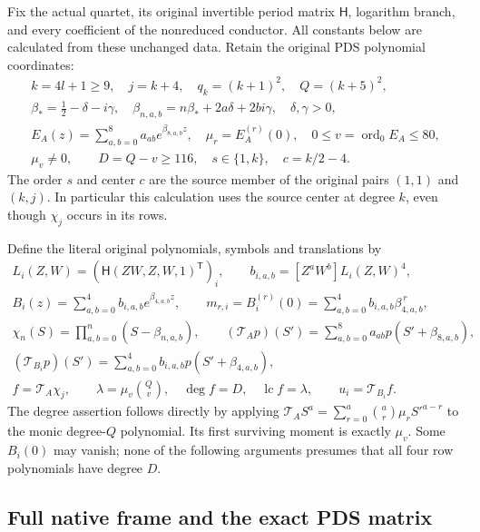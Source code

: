 \documentclass[10pt]{article}
\begin{document}
Fix the actual quartet, its original invertible period matrix
$\mathsf H$, logarithm branch, and every coefficient of the nonreduced
conductor. All constants below are calculated from these unchanged data.
Retain the original PDS polynomial coordinates:
\[
\begin{gathered}
 k=4l+1\ge9,\quad j=k+4,\quad q_k=(k+1)^2,\quad Q=(k+5)^2,\\
 \beta_*=\tfrac12-\delta-i\gamma,\quad
 \beta_{n,a,b}=n\beta_*+2a\delta+2bi\gamma,\quad\delta,\gamma>0,\\
 E_A(z)=\sum_{a,b=0}^8a_{ab}e^{\beta_{8,a,b}z},\quad
 \mu_r=E_A^{(r)}(0),\quad0\le v=\operatorname{ord}_0 E_A\le80,\\
 \mu_v\ne0,\qquad D=Q-v\ge116,\quad s\in\{1,k\},\quad c=k/2-4 .
\end{gathered}\tag{PFG1}
\]
The order $s$ and center $c$ are the source member of the original
pairs $(1,1)$ and $(k,j)$. In particular this calculation uses the
source center at degree $k$, even though $\chi_j$ occurs in its rows.

Define the literal original polynomials, symbols and translations by
\[
\begin{gathered}
 L_i(Z,W)=(\mathsf H(ZW,Z,W,1)^{\mathsf T})_i,\qquad
 b_{i,a,b}=[Z^aW^b]L_i(Z,W)^4,\\
 B_i(z)=\sum_{a,b=0}^4 b_{i,a,b}e^{\beta_{4,a,b}z},
 \qquad m_{r,i}=B_i^{(r)}(0)
      =\sum_{a,b=0}^4b_{i,a,b}\beta_{4,a,b}^{\,r},\\
 \chi_n(S)=\prod_{a,b=0}^n(S-\beta_{n,a,b}),\qquad
 (\mathcal T_Ap)(S')=\sum_{a,b=0}^8a_{ab}p(S'+\beta_{8,a,b}),\\
 (\mathcal T_{B_i}p)(S')=\sum_{a,b=0}^4b_{i,a,b}p(S'+\beta_{4,a,b}),\\
 f=\mathcal T_A\chi_j,\qquad
 \lambda=\mu_v\binom Qv,\quad \deg f=D,\quad
 \operatorname{lc}f=\lambda,\qquad u_i=\mathcal T_{B_i}f .
\end{gathered}\tag{PFG2}
\]
The degree assertion follows directly by applying
$\mathcal T_AS^a=\sum_{r=0}^a\binom ar\mu_rS'^{a-r}$
to the monic degree-$Q$ polynomial. Its first surviving moment is
exactly $\mu_v$. Some $B_i(0)$ may vanish; none of the following
arguments presumes that all four row polynomials have degree $D$.

\subsection{Full native frame and the exact PDS matrix}
\end{document}
